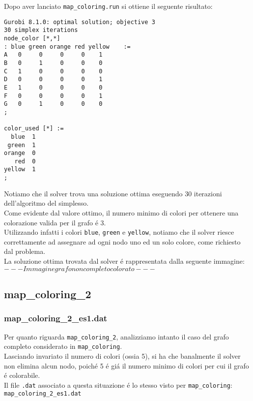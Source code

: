 \documentclass{article}
\begin{document}
Dopo aver lanciato \texttt{map\_coloring.run} si ottiene il seguente risultato:\\
\begin{verbatim}
Gurobi 8.1.0: optimal solution; objective 3
30 simplex iterations
node_color [*,*]
: blue green orange red yellow    :=
A   0     0     0     0    1
B   0     1     0     0    0
C   1     0     0     0    0
D   0     0     0     0    1
E   1     0     0     0    0
F   0     0     0     0    1
G   0     1     0     0    0
;

color_used [*] :=
  blue  1
 green  1
orange  0
   red  0
yellow  1
;
\end{verbatim}

Notiamo che il solver trova una soluzione ottima eseguendo 30 iterazioni dell'algoritmo del simplesso.\\
Come evidente dal valore ottimo, il numero minimo di colori per ottenere una colorazione valida per il grafo \'e 3.\\
Utilizzando infatti i colori \texttt{blue}, \texttt{green} e \texttt{yellow}, notiamo che il solver riesce correttamente ad assegnare ad ogni nodo uno ed un solo colore, come richiesto dal problema.\\
La soluzione ottima trovata dal solver \'e rappresentata dalla seguente immagine:\\

$ --- Immagine grafo non completo colorato--- $\\

\subsection{map\_coloring\_2}
\subsubsection{map\_coloring\_2\_es1.dat}
Per quanto riguarda \texttt{map\_coloring\_2}, analizziamo intanto il caso del grafo completo considerato in \texttt{map\_coloring}.\\
Lasciando invariato il numero di colori (ossia 5), si ha che banalmente il solver non elimina alcun nodo, poich\'e 5 \'e gi\'a il numero  minimo di colori per cui il grafo \'e colorabile.\\
Il file \texttt{.dat} associato a questa situazione \'e lo stesso visto per \texttt{map\_coloring}:\\

\vspace{5mm}
\texttt{map\_coloring\_2\_es1.dat}

\vspace{5mm}
\end{document}
